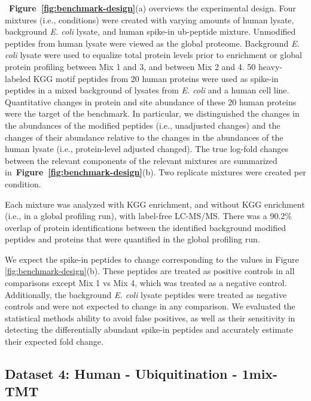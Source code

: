 \documentclass[mcp]{article}
\numberwithin{table}{section}
\def\figref#1{{\bf Figure~\ref{fig:#1}}}
\begin{document}
\medskip {}~\figref{benchmark-design}(a) overviews the experimental design. Four mixtures (i.e., conditions) were created with varying amounts of human lysate, background {\it E. coli} lysate, and human spike-in ub-peptide mixture. Unmodified peptides from human lysate were viewed as the global proteome. Background {\it E. coli} lysate were used to equalize total protein levels prior to enrichment or global protein profiling between Mix 1 and 3, and between Mix 2 and 4. 50 heavy-labeled KGG motif peptides from 20 human proteins were used as spike-in peptides in a mixed background of lysates from {\it E. coli} and a human cell line. Quantitative changes in protein and site abundance of these 20 human proteins were the target of the benchmark. In particular, we distinguished the changes in the abundances of the modified peptides (i.e., unadjusted changes) and the changes of their abundance relative to the changes in the abundances of the human lysate (i.e., protein-level adjusted changed). The true log-fold changes between the relevant components of the relevant mixtures are summarized in~\figref{benchmark-design}(b).  Two replicate mixtures were created per condition. 

\medskip {} Each mixture was analyzed with KGG enrichment, and without KGG enrichment (i.e., in a global profiling run), with label-free LC-MS/MS. There was a 90.2\% overlap of protein identifications between the identified background modified peptides and proteins that were quantified in the global profiling run.

\medskip {} We expect the spike-in peptides to change corresponding to the values in Figure \ref{fig:benchmark-design}(b). These peptides are treated as positive controls in all comparisons except Mix 1 vs Mix 4, which was treated as a negative control. Additionally, the background {\it E. coli} lysate peptides were treated as negative controls and were not expected to change in any comparison. We evaluated the statistical methods ability to avoid false positives, as well as their sensitivity in detecting the differentially abundant spike-in peptides and accurately estimate their expected fold change.


\subsection*{Dataset 4: Human - Ubiquitination - 1mix-TMT}
\label{sec:exp_proc_dataset4}
\end{document}
